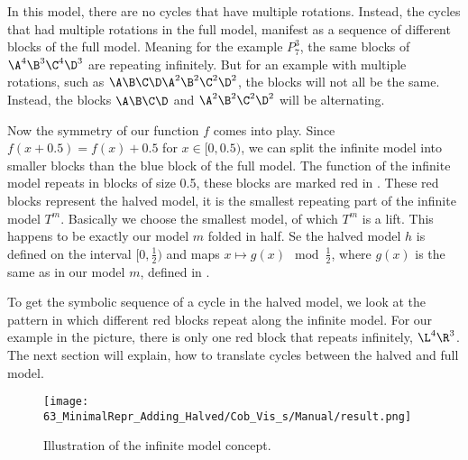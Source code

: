
In this model, there are no cycles that have multiple rotations.
Instead, the cycles that had multiple rotations in the full model, manifest as a sequence of different blocks of the full model.
Meaning for the example $P_7^3$, the same blocks of $\A^4\B^3\C^4\D^3$ are repeating infinitely.
But for an example with multiple rotations, such as $\A\B\C\D\A^2\B^2\C^2\D^2$, the blocks will not all be the same.
Instead, the blocks $\A\B\C\D$ and $\A^2\B^2\C^2\D^2$ will be alternating.

Now the symmetry of our function $f$ comes into play.
Since $f(x + 0.5) = f(x) + 0.5$ for $x \in [0, 0.5)$, we can split the infinite model into smaller blocks than the blue block of the full model.
The function of the infinite model repeats in blocks of size 0.5, these blocks are marked red in .
These red blocks represent the halved model, it is the smallest repeating part of the infinite model $T^m$.
Basically we choose the smallest model, of which $T^m$ is a lift.
This happens to be exactly our model $m$ folded in half.
Se the halved model $h$ is defined on the interval $[0, \frac{1}{2})$ and maps $x \mapsto g(x) \mod \frac{1}{2}$, where $g(x)$ is the same as in our model $m$, defined in .

To get the symbolic sequence of a cycle in the halved model, we look at the pattern in which different red blocks repeat along the infinite model.
For our example in the picture, there is only one red block that repeats infinitely, $\L^4\R^3$.
The next section will explain, how to translate cycles between the halved and full model.

\begin{figure}
	\centering
	\texttt{[image: 63\_MinimalRepr\_Adding\_Halved/Cob\_Vis\_s/Manual/result.png]}
	\caption{Illustration of the infinite model concept.}
	\label{fig:minrep.infinite.model.concept}
\end{figure}



